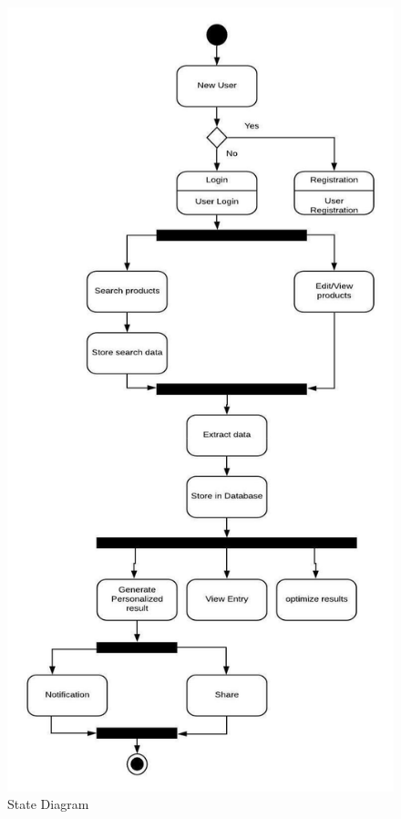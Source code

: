 \begin{figure}[h!]
    \begin{center}
        \includegraphics[scale=0.6]{stated}
        \caption{State Diagram}
    \end{center}
\end{figure}

